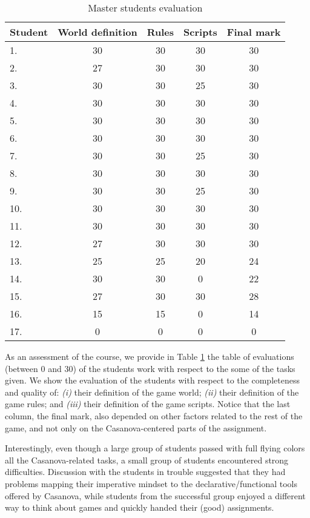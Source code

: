 \begin{table}[ht]
\centering
\begin{tabular}{ l | c c c c }
   Student & World definition & Rules & Scripts & Final mark \\
   \hline
   1. & 30 & 30 & 30 & 30 \\ 
   2. & 27 & 30 & 30 & 30 \\ 
   3. & 30 & 30 & 25 & 30 \\ 
   4. & 30 & 30 & 30 & 30 \\ 
   5. & 30 & 30 & 30 & 30 \\ 
   6. & 30 & 30 & 30 & 30 \\ 
   7. & 30 & 30 & 25 & 30 \\ 
   8. & 30 & 30 & 30 & 30 \\ 
   9. & 30 & 30 & 25 & 30 \\ 
   10. & 30 & 30 & 30 & 30 \\ 
   11. & 30 & 30 & 30 & 30 \\ 
   12. & 27 & 30 & 30 & 30 \\ 
   13. & 25 & 25 & 20 & 24 \\ 
   14. & 30 & 30 & 0 & 22 \\ 
   15. & 27 & 30 & 30 & 28 \\ 
   16. & 15 & 15 & 0 & 14 \\ 
   17. & 0 & 0 & 0 & 0 \\ 
\end{tabular}
\caption{Master students evaluation}
\label{table:master_evaluations}
\end{table}

As an assessment of the course, we provide in Table \ref{table:master_evaluations} the table of evaluations (between 0 and 30) of the students work with respect to the some of the tasks given. We show the evaluation of the students with respect to the completeness and quality of: \textit{(i)} their definition of the game world; \textit{(ii)} their definition of the game rules; and \textit{(iii)} their definition of the game scripts. Notice that the last column, the final mark, also depended on other factors related to the rest of the game, and not only on the Casanova-centered parts of the assignment. 

Interestingly, even though a large group of students passed with full flying colors all the Casanova-related tasks, a small group of students encountered strong difficulties. Discussion with the students in trouble  suggested that they had problems mapping their imperative mindset to the declarative/functional tools offered by Casanova, while students from the successful group enjoyed a different way to think about games and quickly handed their (good) assignments.
